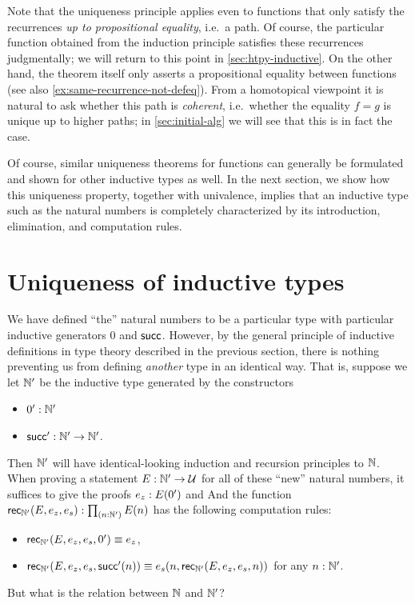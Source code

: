 Note that the uniqueness principle applies even to functions that only satisfy the recurrences \emph{up to propositional equality}, i.e.\ a path.
Of course, the particular function obtained from the induction principle satisfies these recurrences judgmentally; we will return to this point in \cref{sec:htpy-inductive}.
On the other hand, the theorem itself only asserts a propositional equality between functions (see also \cref{ex:same-recurrence-not-defeq}).
From a homotopical viewpoint it is natural to ask whether this path is \emph{coherent}, i.e.\ whether the equality $f=g$ is unique up to higher paths; in \cref{sec:initial-alg} we will see that this is in fact the case.

Of course, similar uniqueness theorems for functions can generally be formulated and shown for other inductive types as well.
In the next section, we show how this uniqueness property, together with univalence, implies that an inductive type such as the natural numbers is completely characterized by its introduction, elimination, and computation rules.

%
%


\section{Uniqueness of inductive types}
\label{sec:appetizer-univalence}

%
We have defined ``the'' natural numbers to be a particular type \nat with particular inductive generators $0$ and $\mathsf{succ}$.
However, by the general principle of inductive definitions in type theory described in the previous section, there is nothing preventing us from defining \emph{another} type in an identical way.
That is, suppose we let $\mathbb{N}'$ be the inductive type generated by the constructors
\begin{itemize}
\item $0':\mathbb{N}'$
\item $\mathsf{succ}':\mathbb{N}'\to\mathbb{N}'$.
\end{itemize}
Then $\mathbb{N}'$ will have identical-looking induction and recursion principles to $\mathbb{N}$.
When proving a statement $E : \mathbb{N}' \to \mathcal{U}$ for all of these ``new'' natural numbers, it suffices to give the proofs $e_z : E(0')$ and 
And the function $\rec\natp(E,e_z,e_s) : \prd{n:\natp} E(n)$ has the following computation rules:
\begin{itemize}
\item $\mathsf{rec}_{\mathbb{N}'}(E,e_z,e_s,0') \equiv e_z$,
\item $\mathsf{rec}_{\mathbb{N}'}(E,e_z,e_s,\mathsf{succ}'(n)) \equiv e_s(n,\mathsf{rec}_{\mathbb{N}'}(E,e_z,e_s,n))$ for any $n : \mathbb{N}'$.
\end{itemize}
But what is the relation between $\mathbb{N}$ and $\mathbb{N}'$?

